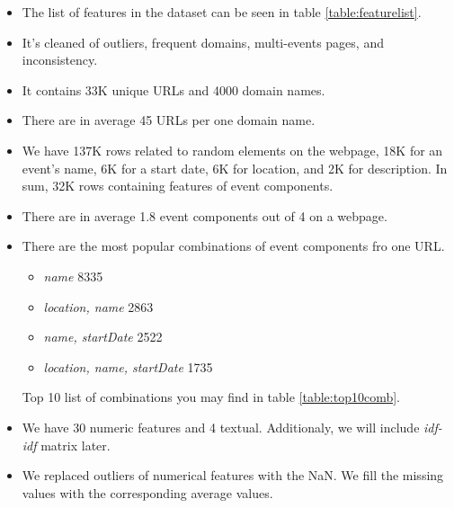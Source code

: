 \begin{itemize}
    \item The list of features in the dataset can be seen in table \ref{table:featurelist}.
    \item It's cleaned of outliers, frequent domains, multi-events pages, and inconsistency. 
    \item It contains 33K unique URLs and  4000 domain names. 
    \item There are in average 45 URLs per one domain name. 
    \item We have 137K rows related to random elements on the webpage, 18K for an event's name, 6K for a start date, 6K for location, and 2K for description. In sum, 32K rows containing features of event components. 
    \item There are in average 1.8 event components out of 4 on a webpage. 
    \item There are the most popular combinations of event components fro one URL. 
    \begin{itemize}
        \item \textit{name} 8335
        \item \textit{location, name} 2863 
        \item \textit{name, startDate} 2522 
        \item \textit{location, name, startDate} 1735
    \end{itemize}
    Top 10 list of combinations you may find in table \ref{table:top10comb}.
    \item We have 30 numeric features and 4 textual. Additionaly, we will include \textit{idf-idf} matrix later.
    \item We replaced outliers of numerical features with the NaN. We fill the missing values with the corresponding average values.
\end{itemize}


